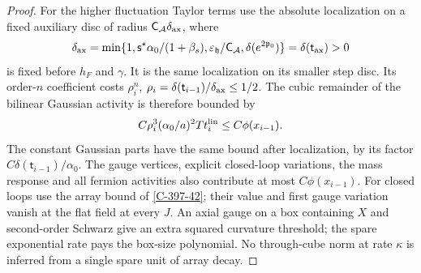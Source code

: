 \documentclass[11pt,letterpaper,reqno]{amsart}
\theoremstyle{definition}
\theoremstyle{remark}
\begin{document}
\begin{proof}
For the higher fluctuation Taylor terms use the absolute localization
on a fixed auxiliary disc of radius
$\mathsf C_{\mathcal A}\delta_{\rm ax}$, where
\[
 \delta_{\rm ax}=\min\{1,\mathsf s^\star\alpha_0/(1+\beta_s),
       \varepsilon_{\mathfrak h}/\mathsf C_{\mathcal A},
       \delta(e^{2\mathfrak p_0})\}=\delta(\mathsf t_{\rm ax})>0
\]
is fixed before $h_F$ and $\gamma$. It is the same localization on its smaller step
disc. Its order-$n$ coefficient costs
$\rho_i^n$, $\rho_i=\delta(\mathsf t_{i-1})/\delta_{\rm ax}\le1/2$.
The cubic remainder of the bilinear Gaussian activity is therefore
bounded by
\[
 C\rho_i^3(\alpha_0/a)^2Tt_i^{\rm lin}\le C\phi(x_{i-1}).
\]
The constant Gaussian parts have the same bound after localization,
by its factor $C\delta(\mathsf t_{i-1})/\alpha_0$.
The gauge vertices, explicit closed-loop variations, the mass
response and all fermion activities also contribute at most
$C\phi(x_{i-1})$. For closed loops use the array bound of
\cref{C-397-42}; their value and first gauge variation vanish
at the flat field at every $J$. An axial gauge on a box containing
$X$ and second-order Schwarz give an extra squared curvature
threshold; the spare exponential rate pays the box-size polynomial.
No through-cube norm at rate $\kappa$ is inferred from a single
spare unit of array decay.


\end{proof}
\end{document}
